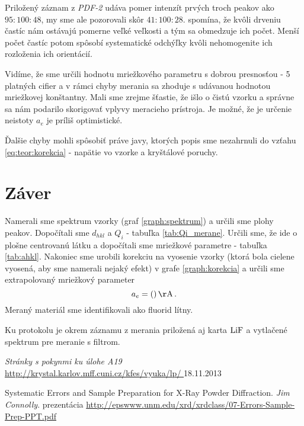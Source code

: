 \documentclass[a4paper, 10pt]{article}
\newcommand{\unit}[1]{\ensuremath{\, \mathrm{#1}}}
\begin{document}
Priložený záznam z \textit{PDF-2} udáva pomer intenzít prvých troch peakov ako $95:100:48$, my sme ale pozorovali skôr $41:100:28$.  \cite{pres} spomína, že kvôli drveniu častíc nám ostávajú pomerne veľké veľkosti a tým sa obmedzuje ich počet. Menší počet častíc potom spôsobí systematické odchýľky kvôli nehomogenite ich rozloženia ich orientácií.

Vidíme, že sme určili hodnotu mriežkového parametru s dobrou presnosťou - 5 platných cifier a v rámci chyby merania sa zhoduje s udávanou hodnotou mriežkovej konštantny. Mali sme zrejme šťastie, že išlo o čistú vzorku a správne sa nám podarilo skorigovať vplyvy meracieho prístroja. Je možné, že je určenie neistoty $a_e$ je príliš optimistické. 

Ďalšie chyby mohli spôsobiť práve javy, ktorých popis sme nezahrnuli do vzťahu \ref{eq:teor:korekcia} - napätie vo vzorke a kryštálové poruchy. 

\section*{Záver}
Namerali sme spektrum vzorky (graf \ref{graph:spektrum}) a určili sme plohy peakov. Dopočítali sme $d_{hkl}$ a $Q_i$  - tabuľka \ref{tab:Qi_merane}. Určili sme, že ide o plošne centrovanú látku a dopočítali sme mriežkové parametre - tabuľka \ref{tab:ahkl}. Nakoniec sme urobili korekciu na vyosenie vzorky (ktorá bola cielene vyosená, aby sme namerali nejaký efekt) v grafe \ref{graph:korekcia} a určili sme extrapolovaný mriežkový parameter
$$
a_e = ()\unit\AA\,.
$$
Meraný materiál sme identifikovali ako fluorid lítny.

Ku protokolu je okrem záznamu z merania priložená aj karta $\ce{LiF}$ a vytlačené spektrum pre meranie s filtrom.


\begin{thebibliography}{9}

    \emph{Stránky s pokynmi ku úlohe A19} \\
    \url{http://krystal.karlov.mff.cuni.cz/kfes/vyuka/lp/
} 18.11.2013

    Systematic Errors and Sample Preparation for X-Ray Powder Diffraction.  \textit{Jim Connolly}. prezentácia
    \url{http://epswww.unm.edu/xrd/xrdclass/07-Errors-Sample-Prep-PPT.pdf}


\end{thebibliography}
\end{document}
